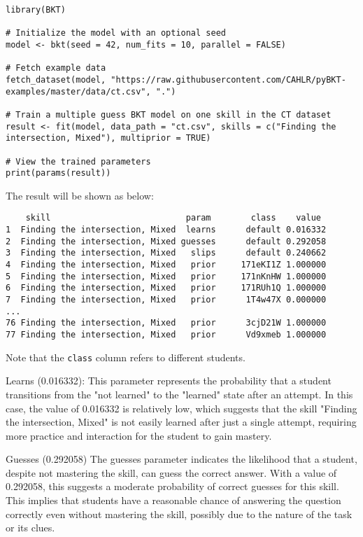 \documentclass{article}
\begin{document}
\begin{lstlisting}[caption={R code to train a PPS BKT model}]
library(BKT)

# Initialize the model with an optional seed
model <- bkt(seed = 42, num_fits = 10, parallel = FALSE)

# Fetch example data
fetch_dataset(model, "https://raw.githubusercontent.com/CAHLR/pyBKT-examples/master/data/ct.csv", ".")

# Train a multiple guess BKT model on one skill in the CT dataset
result <- fit(model, data_path = "ct.csv", skills = c("Finding the intersection, Mixed"), multiprior = TRUE)

# View the trained parameters
print(params(result))
\end{lstlisting}

The result will be shown as below:

\begin{verbatim}
    skill                           param        class    value
1  Finding the intersection, Mixed  learns      default 0.016332
2  Finding the intersection, Mixed guesses      default 0.292058
3  Finding the intersection, Mixed   slips      default 0.240662
4  Finding the intersection, Mixed   prior     171eKI1Z 1.000000
5  Finding the intersection, Mixed   prior     171nKnHW 1.000000
6  Finding the intersection, Mixed   prior     171RUh1Q 1.000000
7  Finding the intersection, Mixed   prior      1T4w47X 0.000000
...
76 Finding the intersection, Mixed   prior      3cjD21W 1.000000
77 Finding the intersection, Mixed   prior      Vd9xmeb 1.000000
\end{verbatim}
    
Note that the \texttt{class} column refers to different students.

Learns (0.016332): This parameter represents the probability that a student transitions from the "not learned" to the "learned" state after an attempt. In this case, the value of 0.016332 is relatively low, which suggests that the skill "Finding the intersection, Mixed" is not easily learned after just a single attempt, requiring more practice and interaction for the student to gain mastery.

Guesses (0.292058) The guesses parameter indicates the likelihood that a student, despite not mastering the skill, can guess the correct answer. With a value of 0.292058, this suggests a moderate probability of correct guesses for this skill. This implies that students have a reasonable chance of answering the question correctly even without mastering the skill, possibly due to the nature of the task or its clues.
\end{document}
